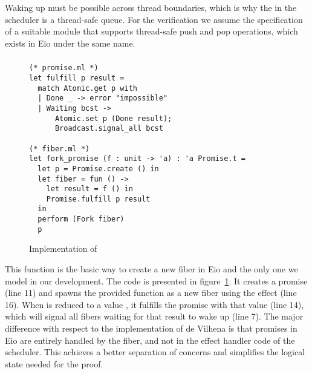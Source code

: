 Waking up must be possible across thread boundaries, which is why the  in the scheduler is a thread-safe queue.
For the verification we assume the specification of a suitable  module that supports thread-safe push and pop operations, which exists in Eio under the same name.


\subsubsection{}
\label{sec:sched-impl-fork}

\begin{figure}[ht]
  \begin{verbatim}
(* promise.ml *)
let fulfill p result =
  match Atomic.get p with
  | Done _ -> error "impossible"
  | Waiting bcst ->
      Atomic.set p (Done result);
      Broadcast.signal_all bcst
  
(* fiber.ml *)
let fork_promise (f : unit -> 'a) : 'a Promise.t =
  let p = Promise.create () in
  let fiber = fun () ->
    let result = f () in
    Promise.fulfill p result
  in
  perform (Fork fiber) 
  p
  \end{verbatim}
  \caption{Implementation of }
  \label{fig:sched-impl-fork}
\end{figure}


This function is the basic way to create a new fiber in Eio and the only one we model in our development.
The code is presented in figure~\ref{fig:sched-impl-fork}.
It creates a promise (line 11) and spawns the provided function as a new fiber using the \efork{} effect (line 16).
When  is reduced to a value , it fulfills the promise with that value (line 14), which will signal all fibers waiting for that result to wake up (line 7).
The major difference with respect to the implementation of de Vilhena is that promises in Eio are entirely handled by the fiber, and not in the effect handler code of the scheduler.
This achieves a better separation of concerns and simplifies the logical state needed for the proof.

\subsubsection{}
\label{sec:sched-impl-await}

